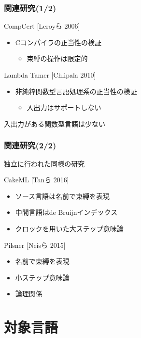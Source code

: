 \documentclass[dvipdfmx,cjk,xcolor=dvipsnames,envcountsect,notheorems,12pt]{beamer}
\theoremstyle{definition}
\begin{document}
\begin{frame}
	\frametitle{関連研究(1/2)}
	\LARGE CompCert [Leroyら 2006]
	\begin{itemize}
		\item Cコンパイラの正当性の検証
			\begin{itemize}
				\item 束縛の操作は限定的
			\end{itemize}
	\end{itemize}

	Lambda Tamer [Chlipala 2010]
	\begin{itemize}
		\item 非純粋関数型言語処理系の正当性の検証
			\begin{itemize}
				\item 入出力はサポートしない
			\end{itemize}
	\end{itemize}

	\vfill

	入出力がある関数型言語は少ない
\end{frame}

\begin{frame}
	\frametitle{関連研究(2/2)}
	\LARGE
	独立に行われた同様の研究

	\vfill

	CakeML [Tanら 2016]
	\begin{itemize}
		\item ソース言語は名前で束縛を表現
		\item 中間言語はde Bruijnインデックス
		\item クロックを用いた大ステップ意味論
	\end{itemize}

	Pilsner [Neisら 2015]
	\begin{itemize}
		\item 名前で束縛を表現
		\item 小ステップ意味論
		\item 論理関係
	\end{itemize}
\end{frame}

\section{対象言語}
\end{document}
